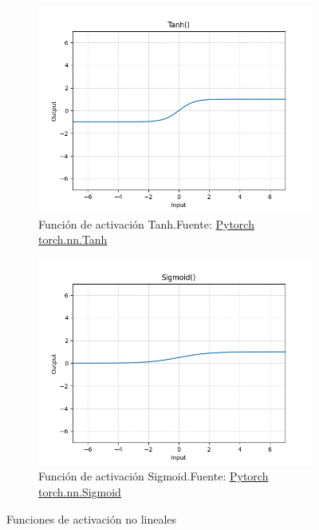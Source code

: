 \begin{figure}[H]
  \medskip %
  \begin{subfigure}{.475\linewidth}
    \centering
    \includegraphics[width=0.75\linewidth]{figures/equations/Tanh.png}
    \caption{Función de activación Tanh.\newline{}Fuente: \href{https://pytorch.org/docs/stable/generated/torch.nn.Tanh.html}{Pytorch torch.nn.Tanh}}
    \label{subfig:torch.nn.Tanh}
  \end{subfigure}\hfill %
  \begin{subfigure}{.475\linewidth}
    \centering
    \includegraphics[width=0.75\linewidth]{figures/equations/Sigmoid.png}
    \caption{Función de activación Sigmoid.\newline{}Fuente: \href{https://pytorch.org/docs/stable/generated/torch.nn.Sigmoid.html}{Pytorch torch.nn.Sigmoid}}
    \label{subfig:torch.nn.Sigmoid}
  \end{subfigure}

  \caption{Funciones de activación no lineales}
  \label{fig:equations--Non-linear-Activations}
\end{figure}


